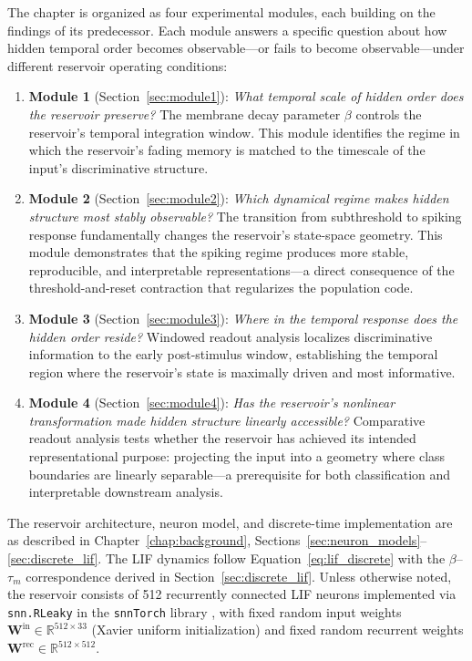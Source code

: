 The chapter is organized as four experimental modules, each building on the findings of its predecessor. Each module answers a specific question about how hidden temporal order becomes observable---or fails to become observable---under different reservoir operating conditions:
\begin{enumerate}
    \item \textbf{Module 1} (Section~\ref{sec:module1}): \emph{What temporal scale of hidden order does the reservoir preserve?} The membrane decay parameter $\beta$ controls the reservoir's temporal integration window. This module identifies the regime in which the reservoir's fading memory is matched to the timescale of the input's discriminative structure.
    \item \textbf{Module 2} (Section~\ref{sec:module2}): \emph{Which dynamical regime makes hidden structure most stably observable?} The transition from subthreshold to spiking response fundamentally changes the reservoir's state-space geometry. This module demonstrates that the spiking regime produces more stable, reproducible, and interpretable representations---a direct consequence of the threshold-and-reset contraction that regularizes the population code.
    \item \textbf{Module 3} (Section~\ref{sec:module3}): \emph{Where in the temporal response does the hidden order reside?} Windowed readout analysis localizes discriminative information to the early post-stimulus window, establishing the temporal region where the reservoir's state is maximally driven and most informative.
    \item \textbf{Module 4} (Section~\ref{sec:module4}): \emph{Has the reservoir's nonlinear transformation made hidden structure linearly accessible?} Comparative readout analysis tests whether the reservoir has achieved its intended representational purpose: projecting the input into a geometry where class boundaries are linearly separable---a prerequisite for both classification and interpretable downstream analysis.
\end{enumerate}

The reservoir architecture, neuron model, and discrete-time implementation are as described in Chapter~\ref{chap:background}, Sections~\ref{sec:neuron_models}--\ref{sec:discrete_lif}. The LIF dynamics follow Equation~\eqref{eq:lif_discrete} with the $\beta$--$\tau_m$ correspondence derived in Section~\ref{sec:discrete_lif}. Unless otherwise noted, the reservoir consists of 512 recurrently connected LIF neurons implemented via \texttt{snn.RLeaky} in the \texttt{snnTorch} library \cite{eshraghian_training_2023}, with fixed random input weights $\mathbf{W}^{\text{in}} \in \mathbb{R}^{512 \times 33}$ (Xavier uniform initialization) and fixed random recurrent weights $\mathbf{W}^{\text{rec}} \in \mathbb{R}^{512 \times 512}$.

